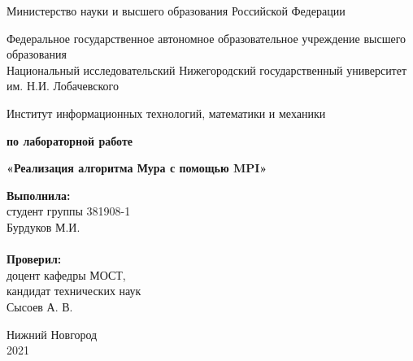 \documentclass{report}
\begin{document}
\begin{titlepage}

\begin{center}
Министерство науки и высшего образования Российской Федерации
\end{center}

\begin{center}
Федеральное государственное автономное образовательное учреждение высшего образования \\
Национальный исследовательский Нижегородский государственный университет им. Н.И. Лобачевского
\end{center}

\begin{center}
Институт информационных технологий, математики и механики
\end{center}

\vspace{4em}

\begin{center}
\textbf{ по лабораторной работе} \\
\end{center}
\begin{center}
\textbf{\Large«Реализация алгоритма Мура с помощью MPI»} \\
\end{center}

\vspace{4em}

\newbox{\lbox}
\newlength{\maxl}
\setlength{\maxl}{\wd\lbox}
\hfill\parbox{7cm}{
\hspace*{5cm}\hspace*{-5cm}\textbf{Выполнила:} \\ студент группы 381908-1 \\ Бурдуков М.И.\\
\\
\hspace*{5cm}\hspace*{-5cm}\textbf{Проверил:}\\ доцент кафедры МОСТ, \\ кандидат технических наук \\ Сысоев А. В.\\
}
\vspace{\fill}

\begin{center} Нижний Новгород \\ 2021 \end{center}

\end{titlepage}
\end{document}
